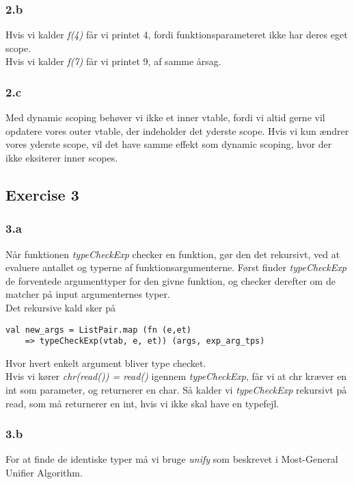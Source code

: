 \documentclass[12pt]{article}
\begin{document}
\subsubsection{2.b}
Hvis vi kalder \textit{f(4)} får vi printet 4, fordi funktionsparameteret ikke har deres eget scope.\\
Hvis vi kalder \textit{f(7)} får vi printet 9, af samme årsag.

\subsubsection{2.c}
Med dynamic scoping behøver vi ikke et inner vtable, fordi vi altid gerne vil opdatere vores outer vtable, der indeholder det yderste scope. Hvis vi kun ændrer vores yderste scope, vil det have samme effekt som dynamic scoping, hvor der ikke eksiterer inner scopes. 

\pagebreak

\subsection{Exercise 3}

\subsubsection{3.a}
Når funktionen \textit{typeCheckExp} checker en funktion, gør den det rekursivt, ved at evaluere antallet og typerne af funktionsargumenterne. Først finder \textit{typeCheckExp} de forventede argumenttyper for den givne funktion, og checker derefter om de matcher på input argumenternes typer.\\
Det rekursive kald sker på
\begin{lstlisting}
val new_args = ListPair.map (fn (e,et) 
	=> typeCheckExp(vtab, e, et)) (args, exp_arg_tps)
\end{lstlisting}
Hvor hvert enkelt argument bliver type checket.\\
Hvis vi kører \textit{chr(read()) = read()} igennem \textit{typeCheckExp}, får vi at chr kræver en int som parameter, og returnerer en char. Så kalder vi \textit{typeCheckExp} rekursivt på read, som må returnerer en int, hvis vi ikke skal have en typefejl.

\subsubsection{3.b}
For at finde de identiske typer må vi bruge \textit{unify} som beskrevet i Most-General Unifier Algorithm.
\end{document}
